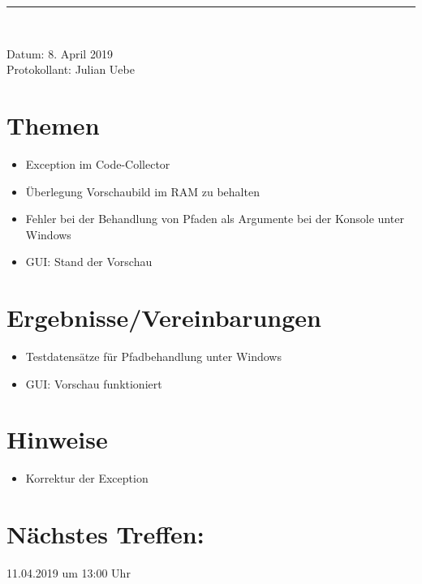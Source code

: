 \begin{center}  
	\vspace{0.5pt}\nointerlineskip\rule{\textwidth}{0.2pt}\\ 
	\vspace{0.5pt}\nointerlineskip
\end{center} 
\large Datum: 8. April 2019\vspace{3pt}\\\large Protokollant: Julian Uebe
\section*{Themen}
\begin{itemize}
	\item Exception im Code-Collector
	\item Überlegung Vorschaubild im RAM zu behalten
	\item Fehler bei der Behandlung von Pfaden als Argumente bei der Konsole unter Windows
	\item GUI: Stand der Vorschau
\end{itemize}
\section*{Ergebnisse/Vereinbarungen}
\begin{itemize}
	\item Testdatensätze für Pfadbehandlung unter Windows
	\item GUI: Vorschau funktioniert
\end{itemize}
\section*{Hinweise}
\begin{itemize}
	\item Korrektur der Exception
\end{itemize}
\section*{Nächstes Treffen:}
11.04.2019 um 13:00 Uhr